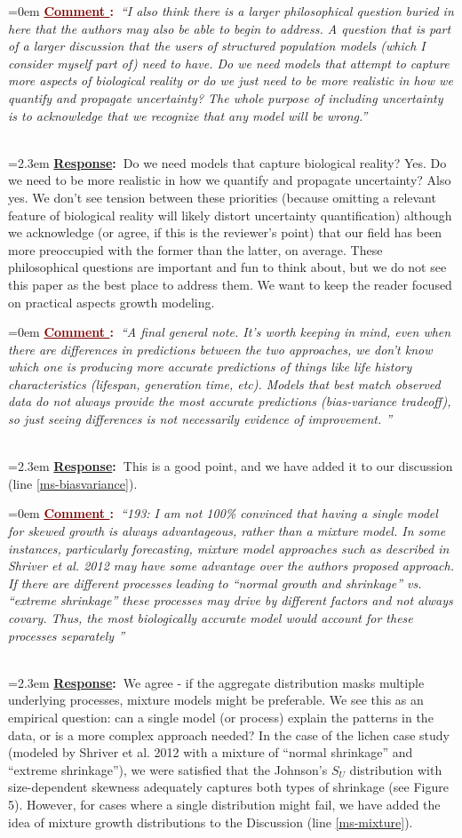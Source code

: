 \documentclass[12pt]{article}
\newcounter{cN}
\newcommand{\comment}[1]{
	\vspace{2em}
	\refstepcounter{cN} %
	\noindent \hangindent=0em \textbf{\textcolor{Maroon}{\uline{Comment \thecN}:~}}\emph{``#1''}
	}
\newcommand{\response}[1]{
	\\[0.25em]
	\hangindent=2.3em \textbf{\textcolor{NavyBlue}{\uline{Response}:~}}#1
	}
\begin{document}
\comment{I also think there is a larger philosophical question buried in here that the authors may also be able to begin to address. A question that is part of a larger discussion that the users of structured population models (which I consider myself part of) need to have.  Do we need models that attempt to capture more aspects of biological reality or do we just need to be more realistic in how we quantify and propagate uncertainty? The whole purpose of including uncertainty is to acknowledge that we recognize that any model will be wrong.}
\response{Do we need models that capture biological reality? Yes. Do we need to be more realistic in how we quantify and propagate uncertainty? Also yes. We don't see tension between these priorities (because omitting a relevant feature of biological reality will likely distort uncertainty quantification) although we acknowledge (or agree, if this is the reviewer's point) that our field has been more preoccupied with the former than the latter, on average. These philosophical questions are important and fun to think about, but we do not see this paper as the best place to address them. We want to keep the reader focused on practical aspects growth modeling.}

\comment{A final general note.  It’s worth keeping in mind, even when there are differences in predictions between the two approaches, we don’t know which one is producing more accurate predictions of things like life history characteristics (lifespan, generation time, etc). Models that best match observed data do not always provide the most accurate predictions (bias-variance tradeoff), so just seeing differences is not necessarily evidence of improvement.  }
\response{This is a good point, and we have added it to our discussion (line \ref{ms-biasvariance}). }

\comment{193: I am not 100\% convinced that having a single model for skewed growth is always advantageous, rather than a mixture model. In some instances, particularly forecasting, mixture model approaches such as described in Shriver et al. 2012 may have some advantage over the authors proposed approach. If there are different processes leading to “normal growth and shrinkage” vs. “extreme shrinkage” these processes may drive by different factors and not always covary. Thus, the most biologically accurate model would account for these processes separately }
\response{We agree - if the aggregate distribution masks multiple underlying processes, mixture models might be preferable. We see this as an empirical question: can a single model (or process) explain the patterns in the data, or is a more complex approach needed? In the case of the lichen case study (modeled by Shriver et al. 2012 with a mixture of ``normal shrinkage'' and ``extreme shrinkage''), we were satisfied that the Johnson's $S_{U}$ distribution with size-dependent skewness adequately captures both types of shrinkage (see Figure 5). However, for cases where a single distribution might fail, we have added the idea of mixture growth distributions to the Discussion (line \ref{ms-mixture}).}
\end{document}

